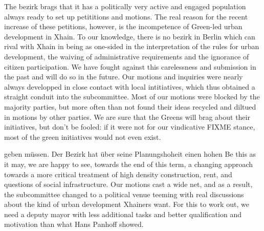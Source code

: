 \documentclass[a4paper,10pt]{article}
\begin{document}
The bezirk brags that it has a  politically very active and engaged population always ready to set up petititions and motions. The real reason for the recent increase of these petitions, however, is the incompetence of Green-led urban development in Xhain. To our knowledge, there is no bezirk in Berlin which can rival with Xhain in being as one-sided in the interpretation of the rules for urban development, the waiving of administrative requirements and the ignorance of citizen participation. We have fought against this carelessness and submission in the past and will do so in the future. Our motions and inquiries were nearly always developped in close contact with local intitiatives, which thus obtained a straight conduit into the subcommittee. Most of our motions were blocked by the majority parties, but more often than not found their ideas recycled and diltued in motions by other parties. We are sure that the Greens will brag about their initiatives, but don't be fooled: if it were not for our vindicative FIXME stance, most of the green initiatives would not even exist.

geben müssen. Der Bezirk hat über seine Planungshoheit einen hohen
Be this as it may, we are happy to see, towards the end of this term, a changing approach towards a more critical treatment of high density construction, rent, and questions of social infrastructure. Our motions cast a wide net, and as a result, the subcommittee changed to a political venue teeming with real discussions about the kind of urban development Xhainers want. For this to work out, we need a deputy mayor with less additional tasks and better qualification and motivation than what Hans Panhoff showed. 

\subsection*{}
\end{document}

